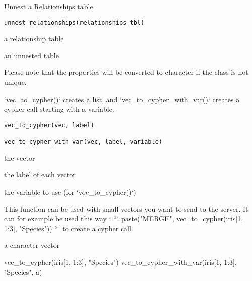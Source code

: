 \documentclass[a4paper]{book}
\begin{document}
%
\begin{Description}\relax
Unnest a Relationships table
\end{Description}
%
\begin{Usage}
\begin{verbatim}
unnest_relationships(relationships_tbl)
\end{verbatim}
\end{Usage}
%
\begin{Arguments}
\begin{ldescription}
\item[\code{relationships\_tbl}] a relationship table
\end{ldescription}
\end{Arguments}
%
\begin{Value}
an unnested table
\end{Value}
%
\begin{Note}\relax
Please note that the properties will be converted to character if the class
is not unique.
\end{Note}
%
\begin{Description}\relax
`vec\_to\_cypher()` creates a list, and `vec\_to\_cypher\_with\_var()`
creates a cypher call starting with a variable.
\end{Description}
%
\begin{Usage}
\begin{verbatim}
vec_to_cypher(vec, label)

vec_to_cypher_with_var(vec, label, variable)
\end{verbatim}
\end{Usage}
%
\begin{Arguments}
\begin{ldescription}
\item[\code{vec}] the vector

\item[\code{label}] the label of each vector

\item[\code{variable}] the variable to use (for `vec\_to\_cypher()`)
\end{ldescription}
\end{Arguments}
%
\begin{Details}\relax
This function can be used with small vectors you want to send
to the server. It can for example be used this way :
```
paste("MERGE", vec\_to\_cypher(iris[1, 1:3], "Species"))
```
to create a cypher call.
\end{Details}
%
\begin{Value}
a character vector
\end{Value}
%
\begin{Examples}
\begin{ExampleCode}

vec_to_cypher(iris[1, 1:3], "Species")
vec_to_cypher_with_var(iris[1, 1:3], "Species", a)
\end{ExampleCode}
\end{Examples}
\printindex{}
\end{document}
